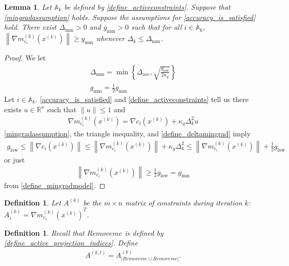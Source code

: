 \documentclass{article}
\newtheorem{definition}[theorem]{Definition}
\newtheorem{lemma}[theorem]{Lemma}
\theoremstyle{case}
\numberwithin{theorem}{subsection}
\newcommand{\activeconstraintsk}{{\mathbb A_{k}}}
\newcommand{\dacc}{{\Delta_{\textrm{acc}}}}
\newcommand{\dk}{\Delta_k}
\newcommand{\gmcik}{{\nabla m_{c_i}^{(k)}\left(\xk\right)}}
\newcommand{\mingrad}{{ g_{\textrm{low}} }}
\newcommand{\Rn}{\mathbb R^n}
\newcommand{\xk}{x^{(k)}}
\newcommand{\deltamingrad}{{\Delta_{\textrm{mm}}}}
\newcommand{\mingradmodel}{{ g_{\textrm{mm}} }}
\newcommand{\activeprojk}{{Remove me}}
\newcommand{\activeprojl}{{Remove me}}
\begin{document}
\color{red}
\begin{lemma}
Let $\activeconstraintsk$ be defined by \cref{define_activeconstraints}.
Suppose that \cref{mingradassumption} holds.
Suppose the assumptions for \cref{accuracy_is_satisfied} hold.
There exist $\deltamingrad > 0$ and $\mingradmodel > 0$ such that for all $i \in \activeconstraintsk$, 
 $\left\|\gmcik\right\| \ge \mingradmodel $ whenever $\dk \le \deltamingrad$.
\end{lemma}
\begin{proof}
We let
\begin{align}
\deltamingrad = \min\left\{\dacc, \sqrt{\frac{\mingrad}{2\kappa_g}}\right\} \label{define_deltamingrad} \\
\mingradmodel = \frac 1 2 \mingradmodel \label{define_mingradmodel}
\end{align}
Let $i \in \activeconstraintsk$.
\cref{accuracy_is_satisfied} and \cref{define_activeconstraints} tell us there exists $u \in \Rn$ such that $\|u\| \le 1$ and
\begin{align*}
\gmcik = \nabla c_i\left(\xk\right) + \kappa_g \dk^2 u
\end{align*}
\cref{mingradassumption}, the triangle inequality, and \cref{define_deltamingrad} imply
\begin{align*}
\mingrad \le \left\|\nabla c_i\left(\xk\right)\right\| \le \left\|\gmcik\right\| + \kappa_g \dk^2 \le \left\|\gmcik\right\| + \frac 1 2 \mingrad
\end{align*}
or just
\begin{align*}
\left\|\gmcik\right\| \ge \frac 1 2 \mingrad = \mingradmodel
\end{align*}
from \cref{define_mingradmodel}.

\end{proof}
\color{black}


\begin{definition}
Let $A^{(k)}$ be the $m \times n$ matrix of constraints during iteration $k$: $A^{(k)}_i = \gmcik^T$.
\end{definition}

\begin{definition}
Recall that $\activeprojk$ is defined by \cref{define_active_projection_indices}.
Define
\begin{align}
A^{(k, l)} = A^{(k)}_{\left|\activeprojk \cup \activeprojl\right|}.
\end{align}
\end{definition}
\end{document}
